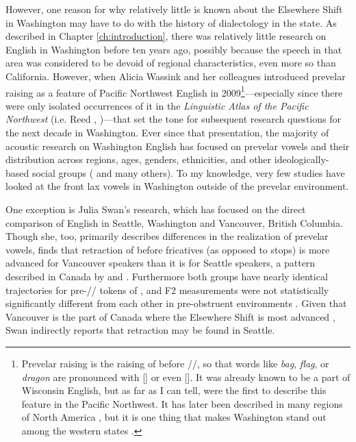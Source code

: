 However, one reason for why relatively little is known about the Elsewhere Shift in Washington may have to do with the history of dialectology in the state. As described in Chapter \ref{ch:introduction}, there was relatively little research on English in Washington before ten years ago, possibly because the speech in that area was considered to be devoid of regional characteristics, even more so than California. However, when Alicia Wassink and her colleagues introduced prevelar raising as a feature of Pacific Northwest English in 2009\footnote{Prevelar raising is the raising of \trap before //, so that words like \textit{bag}, \textit{flag}, or \textit{dragon} are pronounced with [] or even []. It was already known to be a part of Wisconsin English, but as far as I can tell, \citet{wassink_etal_2009} were the first to describe this feature in the Pacific Northwest. It has later been described in many regions of North America \citep{stanley_2019_BEG_paper}, but it is one thing that makes Washington stand out among the western states \citep{wassink_2016_pads}.}---especially since there were only isolated occurrences of it in the \textit{Linguistic Atlas of the Pacific Northwest} (i.e. Reed \citeyear{reed_1956}, \citeyear{reed_1961})---that set the tone for subsequent research questions for the next decade in Washington. Ever since that presentation, the majority of acoustic research on Washington English has focused on prevelar vowels and their distribution across regions, ages, genders, ethnicities, and other ideologically-based social groups (\citealt{wassink_2011, wassink_2015, wassink_2016_pads, freeman_2014, riebold_2015_diss, swan_2016_proceedings, stanley_2018_pwpl} and many others). To my knowledge, very few studies have looked at the front lax vowels in Washington outside of the prevelar environment.

One exception is Julia Swan’s research, which has focused on the direct comparison of English in Seattle, Washington and Vancouver, British Columbia. Though she, too, primarily describes differences in the realization of prevelar vowels, \citet[8]{swan_2016_proceedings} finds that retraction of \trap before fricatives (as opposed to stops) is more advanced for Vancouver speakers than it is for Seattle speakers, a pattern described in Canada by \citet[214]{clarke_etal_1995} and \citet{boberg_2019}. Furthermore both groups have nearly identical trajectories for pre-// tokens of \trap \citeyearpar[10]{swan_2016_proceedings}, and F2 measurements were not statistically significantly different from each other in pre-obstruent environments \citep{swan_2015}. Given that Vancouver is the part of Canada where the Elsewhere Shift is most advanced \citep{hall_2000, tamminga_sadlier_brown_2008, roeder_etal_2018}, Swan indirectly reports that \trap retraction may be found in Seattle.

